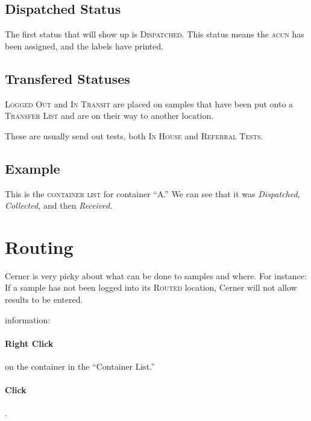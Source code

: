 \subsection{Dispatched Status}

The first status that will show up is \textsc{Dispatched}. This status means the \textsc{\gls{accn}} has been assigned, and the labels have printed.

\subsection{Transfered Statuses}

\textsc{Logged Out} and \textsc{In Transit} are placed on samples that have been put onto a \textsc{Transfer List} and are on their way to another location.

These are usually send out tests, both \textsc{In House} and \textsc{Referral Tests.}

\subsection{Example}

This is the \textsc{container list} for container ``A.'' We can see that it was \textit{Dispatched, Collected,} and then \textit{Received.}\\


\section{Routing\label{sec:ci_show_routing}}
Cerner is very picky about what can be done to samples and where. For instance: If a sample has not been logged into its \textsc{Routed} location, Cerner will not allow results to be entered.

 information:

\paragraph{Right Click} on the container in the ``Container List.''

\paragraph{Click} .\\


